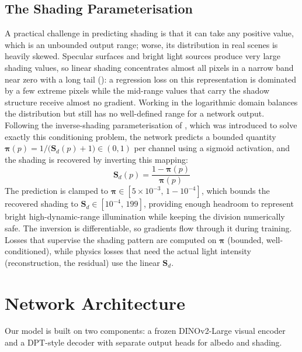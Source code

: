 \subsection{The Shading Parameterisation}

A practical challenge in predicting shading is that it can take any positive
value, which is an unbounded output range; worse, its distribution in
real scenes is heavily skewed.
Specular surfaces and bright light sources produce very large shading values,
so linear shading concentrates almost all pixels in a narrow band near zero
with a long tail (): a regression loss on this
representation is dominated by a few extreme pixels while the mid-range
values that carry the shadow structure receive almost no gradient.
Working in the logarithmic domain balances the distribution but still has no
well-defined range for a network output.
Following the inverse-shading parameterisation of ,
which was introduced to solve exactly this conditioning problem,
the network predicts a bounded quantity
$\boldsymbol{\pi}(p) = 1 / \bigl(\mathbf{S}_d(p) + 1\bigr) \in (0, 1)$
per channel using a sigmoid activation, and the shading is recovered by
inverting this mapping:
\begin{equation}
  \mathbf{S}_d(p) = \frac{1 - \boldsymbol{\pi}(p)}{\boldsymbol{\pi}(p)}
  \label{eq:uninvert}
\end{equation}
The prediction is clamped to
$\boldsymbol{\pi} \in [5 \times 10^{-3},\, 1 - 10^{-4}]$, which bounds the
recovered shading to $\mathbf{S}_d \in [10^{-4},\, 199]$, providing enough headroom to
represent bright high-dynamic-range illumination while keeping the division
numerically safe.
The inversion is differentiable, so gradients flow through it during training.
Losses that supervise the shading pattern are computed on $\boldsymbol{\pi}$
(bounded, well-conditioned), while physics losses that need the actual light
intensity (reconstruction, the residual) use the linear $\mathbf{S}_d$.




\section{Network Architecture}
\label{sec:architecture}

Our model is built on two components: a frozen DINOv2-Large visual encoder and a
DPT-style decoder with separate output heads for albedo and shading.


